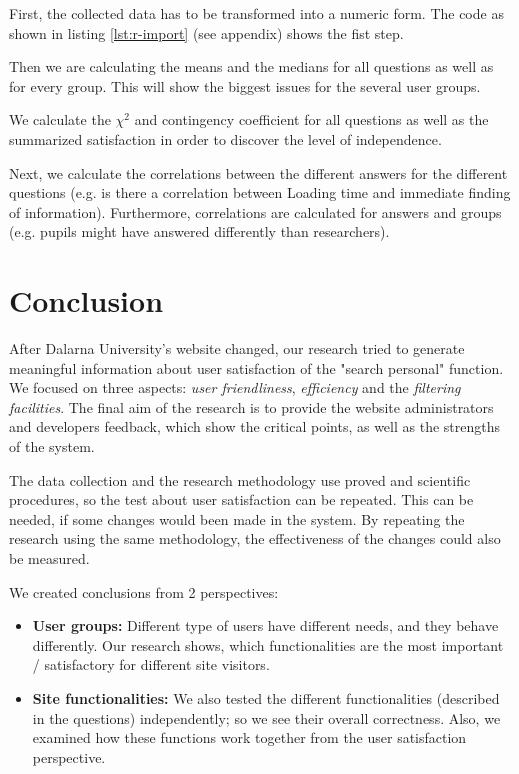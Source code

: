 \documentclass[12pt,a4paper,paper=a4,oneside,titlepage,pdftex]{scrartcl}
\begin{document}
First, the collected data has to be transformed into a numeric form. The code as shown in listing \ref{lst:r-import} (see appendix) shows the fist step.

Then we are calculating the means and the medians for all questions as well as for every group. This will show the biggest issues for the several user groups.

We calculate the $\chi^2$ and contingency coefficient for all questions as well as the summarized satisfaction in order to discover the level of independence.

Next, we calculate the correlations between the different answers for the different questions (e.g. is there a correlation between Loading time and immediate finding of information). Furthermore, correlations are calculated for answers and groups (e.g. pupils might have answered differently than researchers).

\section{Conclusion}

After Dalarna University's website changed, our research tried to generate meaningful information about user satisfaction of the "search personal" function. We focused on  three aspects: \textit{user friendliness}, \textit{efficiency} and the \textit{filtering facilities}. The final aim of the research is to provide the website administrators and developers feedback, which show the critical points, as well as the strengths of the system.

The data collection and the research methodology use proved and scientific procedures, so the test about user satisfaction can be repeated. This can be needed, if some changes would been made in the system. By repeating the research using the same methodology, the effectiveness of the changes could also be measured.

We created conclusions from 2 perspectives:
\begin{itemize}
	\item \textbf{User groups:} Different type of users have different needs, and they behave differently. Our research shows, which functionalities are the most important / satisfactory for different site visitors.
	\item \textbf{Site functionalities:} We also tested the different functionalities (described in the questions) independently; so we see their overall correctness. Also, we examined how these functions work together from the user satisfaction perspective.	
\end{itemize}
\end{document}
